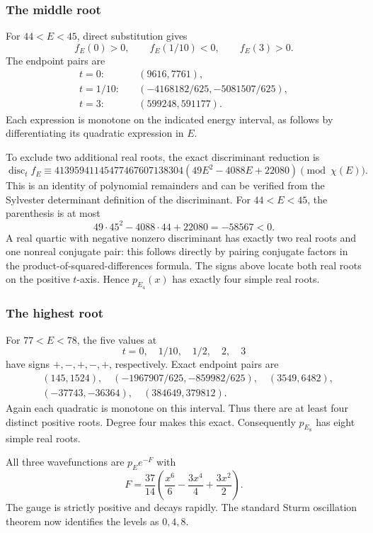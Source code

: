 \documentclass[11pt,a4paper]{article}
\theoremstyle{definition}\newtheorem{definition}[theorem]{Definition}
\theoremstyle{remark}\newtheorem{remark}[theorem]{Remark}
\numberwithin{equation}{section}
\begin{document}
\subsubsection*{The middle root}
For $44<E<45$, direct substitution gives
\[f_E(0)>0,\qquad f_E(1/10)<0,\qquad f_E(3)>0.
\]
The endpoint pairs are\begin{align*}t=0:&\quad(9616,7761),\\t=1/10:&\quad(-4168182/625,-5081507/625),\\t=3:&\quad(599248,591177).\end{align*} Each expression is monotone on the indicated energy interval, as follows by differentiating its quadratic expression in $E$.

To exclude two additional real roots, the exact discriminant reduction is
\begin{equation}\label{H08-disc}
\operatorname{disc}_t f_E\equiv
41395941145477467607138304(49E^2-4088E+22080)\pmod{\chi(E)}.
\end{equation}
This is an identity of polynomial remainders and can be verified from the Sylvester determinant definition of the discriminant. For $44<E<45$, the parenthesis is at most
\[49\cdot45^2-4088\cdot44+22080=-58567<0.
\]
A real quartic with negative nonzero discriminant has exactly two real roots and one nonreal conjugate pair: this follows directly by pairing conjugate factors in the product-of-squared-differences formula. The signs above locate both real roots on the positive $t$-axis. Hence $p_{E_4}(x)$ has exactly four simple real roots.
\subsubsection*{The highest root}
For $77<E<78$, the five values at
\[t=0,\quad1/10,\quad1/2,\quad2,\quad3
\]
have signs $+,-,+,-,+$, respectively. Exact endpoint pairs are
\begin{align*}
&(145,1524),\quad(-1967907/625,-859982/625),\quad(3549,6482),\\
&(-37743,-36364),\quad(384649,379812).
\end{align*}
Again each quadratic is monotone on this interval. Thus there are at least four distinct positive roots. Degree four makes this exact. Consequently $p_{E_8}$ has eight simple real roots.

All three wavefunctions are $p_Ee^{-F}$ with
\[F=\frac{37}{14}\left(\frac{x^6}{6}-\frac{3x^4}{4}+\frac{3x^2}{2}\right).
\]
The gauge is strictly positive and decays rapidly. The standard Sturm oscillation theorem now identifies the levels as $0,4,8$.
\end{document}
